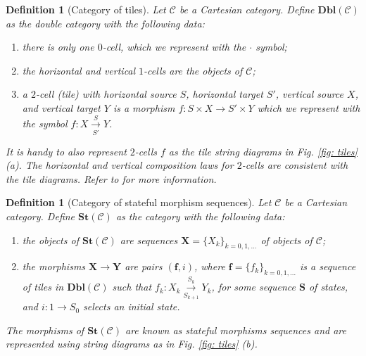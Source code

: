 \documentclass[11pt,a4paper,openright,twoside]{report}
\newcounter{mycounter}
\theoremstyle{plain}
\newtheorem{definition}[mycounter]{Definition}
\theoremstyle{definition}
\begin{document}
\begin{definition}[Category of tiles]
  Let $\mathcal{C}$ be a Cartesian category. Define $\mathbf{Dbl}(\mathcal{C})$ as the double category with the following data:
  \begin{enumerate}
    \item there is only one $0$-cell, which we represent with the $\cdot$ symbol;
    \item the horizontal and vertical $1$-cells are the objects of $\mathcal{C}$;
    \item a $2$-cell (tile) with horizontal source $S$, horizontal target $S'$, vertical source $X$, and vertical target $Y$ is a morphism $f: S \times X \to S' \times Y$ which we represent with the symbol $f:X \overset{S}{\underset{S'}\longrightarrow} Y$.
  \end{enumerate}
  It is handy to also represent $2$-cells $f$ as the tile string diagrams in \textit{Fig. \ref{fig: tiles} (a)}. The horizontal and vertical composition laws for $2$-cells are consistent with the tile diagrams. Refer to \cite{sprunger2019differentiable} for more information.
\end{definition}

\begin{definition}[Category of stateful morphism sequences]
  Let $\mathcal{C}$ be a Cartesian category. Define $\mathbf{St}(\mathcal{C})$ as the category with the following data:
  \begin{enumerate}
    \item the objects of $\mathbf{St}(\mathcal{C})$ are sequences $\mathbf{X} = \{X_k\}_{k = 0,1,\dots}$ of objects of $\mathcal{C}$;
    \item the morphisms $\mathbf{X} \to \mathbf{Y}$ are pairs $(\mathbf{f}, i)$, where $\mathbf{f} = \{f_k\}_{k = 0,1,\dots}$ is a sequence of tiles in $\mathbf{Dbl}(\mathcal{C})$ such that $f_k: X_k \overset{S_k}{\underset{S_{k+1}}\longrightarrow} Y_k$, for some sequence $\mathbf{S}$ of states, and $i: 1 \to S_0$ selects an initial state. 
  \end{enumerate}
  The morphisms of $\mathbf{St}(\mathcal{C})$ are known as stateful morphisms sequences and are represented using string diagrams as in \textit{Fig. \ref{fig: tiles} (b)}.
\end{definition}
\end{document}
